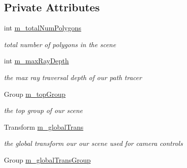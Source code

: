 \subsection*{Private Attributes}
\begin{DoxyCompactItemize}
\item 
\hypertarget{class_path_tracer_scene_a5890db30f89d9ae99c6451d6e3bd0a93}{int \hyperlink{class_path_tracer_scene_a5890db30f89d9ae99c6451d6e3bd0a93}{m\-\_\-total\-Num\-Polygons}}\label{class_path_tracer_scene_a5890db30f89d9ae99c6451d6e3bd0a93}

\begin{DoxyCompactList}\small\item\em total number of polygons in the scene \end{DoxyCompactList}\item 
\hypertarget{class_path_tracer_scene_a40480ccd36667e5af769492dcaab7ae0}{int \hyperlink{class_path_tracer_scene_a40480ccd36667e5af769492dcaab7ae0}{m\-\_\-max\-Ray\-Depth}}\label{class_path_tracer_scene_a40480ccd36667e5af769492dcaab7ae0}

\begin{DoxyCompactList}\small\item\em the max ray traversal depth of our path tracer \end{DoxyCompactList}\item 
\hypertarget{class_path_tracer_scene_a24da785cb80229fb58551fd9aa9ac04a}{Group \hyperlink{class_path_tracer_scene_a24da785cb80229fb58551fd9aa9ac04a}{m\-\_\-top\-Group}}\label{class_path_tracer_scene_a24da785cb80229fb58551fd9aa9ac04a}

\begin{DoxyCompactList}\small\item\em the top group of our scene \end{DoxyCompactList}\item 
\hypertarget{class_path_tracer_scene_a883bee42e482df12c580d3adf20c7e1e}{Transform \hyperlink{class_path_tracer_scene_a883bee42e482df12c580d3adf20c7e1e}{m\-\_\-global\-Trans}}\label{class_path_tracer_scene_a883bee42e482df12c580d3adf20c7e1e}

\begin{DoxyCompactList}\small\item\em the global transform our our scene used for camera controls \end{DoxyCompactList}\item 
\hypertarget{class_path_tracer_scene_a5279e7f6b920634fc023d0a486645f3c}{Group \hyperlink{class_path_tracer_scene_a5279e7f6b920634fc023d0a486645f3c}{m\-\_\-global\-Trans\-Group}}\label{class_path_tracer_scene_a5279e7f6b920634fc023d0a486645f3c}


\end{DoxyCompactItemize}
